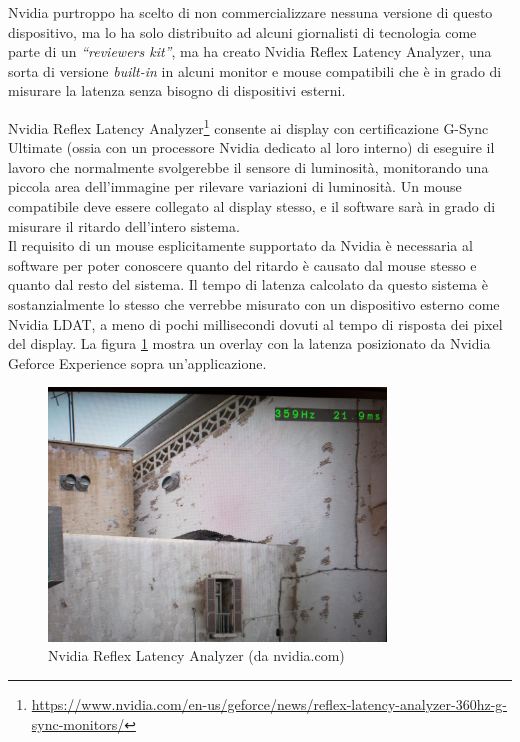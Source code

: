 Nvidia purtroppo ha scelto di non commercializzare nessuna versione di questo dispositivo, ma lo ha solo distribuito ad alcuni giornalisti di tecnologia come parte di un \textit{``reviewers kit''}, ma ha creato Nvidia Reflex Latency Analyzer, una sorta di versione \textit{built-in} in alcuni monitor e mouse compatibili che è in grado di misurare la latenza senza bisogno di dispositivi esterni.

Nvidia Reflex Latency Analyzer\footnote{\url{https://www.nvidia.com/en-us/geforce/news/reflex-latency-analyzer-360hz-g-sync-monitors/}} consente ai display con certificazione G-Sync Ultimate (ossia con un processore Nvidia dedicato al loro interno) di eseguire il lavoro che normalmente svolgerebbe il sensore di luminosità, monitorando una piccola area dell'immagine per rilevare variazioni di luminosità. Un mouse compatibile deve essere collegato al display stesso, e il software sarà in grado di misurare il ritardo dell'intero sistema.\\
Il requisito di un mouse esplicitamente supportato da Nvidia è necessaria al software per poter conoscere quanto del ritardo è causato dal mouse stesso e quanto dal resto del sistema. Il tempo di latenza calcolato da questo sistema è sostanzialmente lo stesso che verrebbe misurato con un dispositivo esterno come Nvidia LDAT, a meno di pochi millisecondi dovuti al tempo di risposta dei pixel del display. La figura \ref{fig:nvreflex_example} mostra un overlay con la latenza posizionato da Nvidia Geforce Experience sopra un'applicazione.

\begin{figure}[h!]
	\centering
	\includegraphics[width=0.8\textwidth]{StatoDellArte_files/nvreflex_example.jpg}
	\caption{Nvidia Reflex Latency Analyzer (da nvidia.com)}
	\label{fig:nvreflex_example}
\end{figure}

